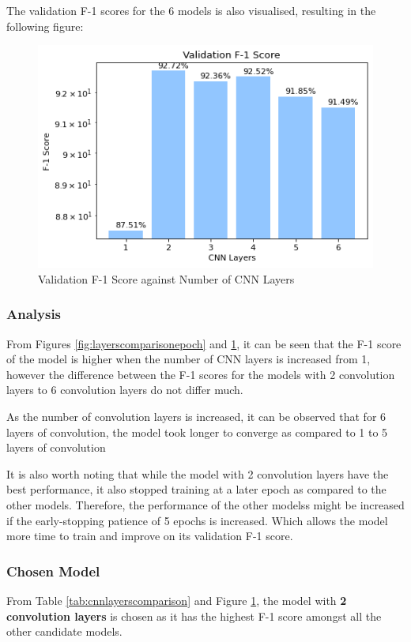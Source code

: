 \documentclass[sigconf,nonacm=true]{acmart}
\begin{document}
The validation F-1 scores for the 6 models is also visualised, resulting in the following figure: 
\begin{figure}[H]
	\centering
	\includegraphics[scale=0.57]{figures/bestf1.png}
	\caption{Validation F-1 Score against Number of CNN Layers}
	\label{fig:layerscomparison}
\end{figure}

\subsubsection{Analysis}
From Figures \ref{fig:layerscomparisonepoch} and \ref{fig:layerscomparison}, it can be seen that the F-1 score of the model is higher when the number of CNN layers is increased from 1, however the difference between the F-1 scores for the models with 2 convolution layers to 6 convolution layers do not differ much.

As the number of convolution layers is increased, it can be observed that for 6 layers of convolution, the model took longer to converge as compared to 1 to 5 layers of convolution

It is also worth noting that while the model with 2 convolution layers have the best performance, it also stopped training at a later epoch as compared to the other models. Therefore, the performance of the other modelss might be increased if the early-stopping patience of 5 epochs is increased. Which allows the model more time to train and improve on its validation F-1 score.

\subsubsection{Chosen Model}
From Table \ref{tab:cnnlayerscomparison} and Figure \ref{fig:layerscomparison}, the model with \textbf{2 convolution layers} is chosen as it has the highest F-1 score amongst all the other candidate models.
\end{document}
